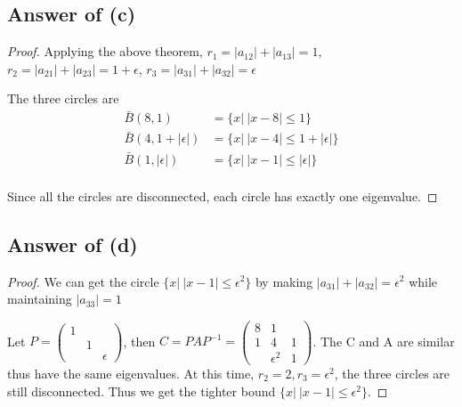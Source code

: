 \subsection*{Answer of (c)}
\begin{proof}
Applying the above theorem, $r_1=|a_{12}|+|a_{13}|=1$, $r_2=|a_{21}|+|a_{23}|=1+\epsilon$, $r_3=|a_{31}|+|a_{32}|=\epsilon$

The three circles are $$\begin{aligned}
\bar{B}(8,1) &= \{x| \ |x-8|\leq 1\} \\
\bar{B}(4,1+|\epsilon|) &= \{x| \ |x-4|\leq 1+|\epsilon|\} \\
\bar{B}(1,|\epsilon|) &= \{x| \ |x-1|\leq |\epsilon|\} \\
\end{aligned}$$

Since all the circles are disconnected, each circle has exactly one eigenvalue.
\end{proof}


\subsection*{Answer of (d)}
\begin{proof}
We can get the circle $\{x| \ |x-1|\leq \epsilon^2\}$ by making $|a_{31}|+|a_{32}|=\epsilon^2$ while maintaining $|a_{33}|=1$

Let $P=\begin{pmatrix}
1 \\ & 1 \\ & & \epsilon
\end{pmatrix}$, then $C=PAP^{-1}=\begin{pmatrix}
8 & 1 \\ 1 & 4 & 1 \\  & \epsilon^2 & 1
\end{pmatrix}$. The C and A are similar thus have the same eigenvalues. At this time, $r_2=2, r_3=\epsilon^2$, the three circles are still disconnected. Thus we get the tighter bound $\{x| \ |x-1|\leq \epsilon^2\}$.
\end{proof}

\newpage
